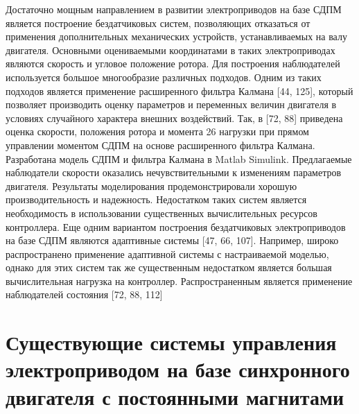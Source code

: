Достаточно мощным направлением в развитии электроприводов на базе СДПМ является построение бездатчиковых систем, позволяющих отказаться от применения дополнительных механических устройств, устанавливаемых на валу двигателя. Основными оцениваемыми координатами в таких электроприводах являются скорость и угловое положение ротора. Для построения наблюдателей используется большое многообразие различных подходов. 
Одним из таких подходов является применение расширенного фильтра Калмана [44, 125], который позволяет производить оценку параметров и переменных величин двигателя в условиях случайного характера внешних воздействий. Так, в [72, 88] приведена оценка скорости, положения ротора и момента 26 нагрузки при прямом управлении моментом СДПМ на основе расширенного фильтра Калмана. Разработана модель СДПМ и фильтра Калмана в Matlab Simulink. Предлагаемые наблюдатели скорости оказались нечувствительными к изменениям параметров двигателя. Результаты моделирования продемонстрировали хорошую производительность и надежность. Недостатком таких систем является необходимость в использовании существенных вычислительных ресурсов контроллера. 
Еще одним вариантом построения бездатчиковых электроприводов на базе СДПМ являются адаптивные системы [47, 66, 107]. Например, широко распространено применение адаптивной системы с настраиваемой моделью, однако для этих систем так же существенным недостатком является большая вычислительная нагрузка на контроллер. 
Распространенным является применение наблюдателей состояния [72, 88, 112]

\section{Существующие системы управления электроприводом на базе синхронного двигателя с постоянными магнитами
} \label{sec:ch1/sec5}
